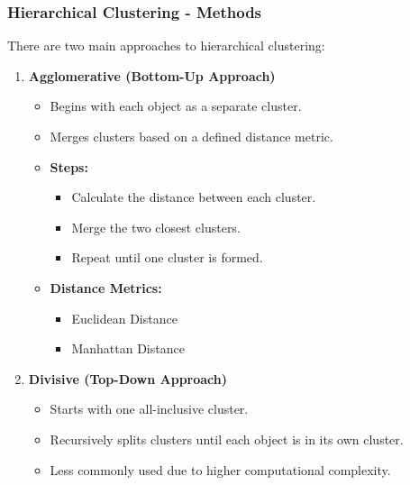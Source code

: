 \documentclass[aspectratio=169]{beamer}
\begin{document}
\begin{frame}[fragile]
    \frametitle{Hierarchical Clustering - Methods}
    There are two main approaches to hierarchical clustering:

    \begin{enumerate}
        \item \textbf{Agglomerative (Bottom-Up Approach)}
        \begin{itemize}
            \item Begins with each object as a separate cluster.
            \item Merges clusters based on a defined distance metric.
            \item \textbf{Steps:}
                \begin{itemize}
                    \item Calculate the distance between each cluster.
                    \item Merge the two closest clusters.
                    \item Repeat until one cluster is formed.
                \end{itemize}
            \item \textbf{Distance Metrics:}
                \begin{itemize}
                    \item Euclidean Distance
                    \item Manhattan Distance
                \end{itemize}
        \end{itemize}

        \item \textbf{Divisive (Top-Down Approach)}
        \begin{itemize}
            \item Starts with one all-inclusive cluster.
            \item Recursively splits clusters until each object is in its own cluster.
            \item Less commonly used due to higher computational complexity.
        \end{itemize}
    \end{enumerate}
\end{frame}
\end{document}
